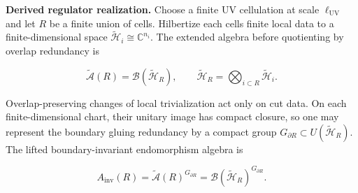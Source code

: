 \textbf{Derived regulator realization.} Choose a finite UV cellulation at scale \(\ell_{\mathrm{UV}}\) and let \(R\) be a finite union of cells. Hilbertize each cell\textquotesingle s finite local data to a finite-dimensional space \(\tilde{\mathcal H}_i\cong \mathbb C^{n_i}\). The extended algebra before quotienting by overlap redundancy is

\[
\widetilde{\mathcal A}(R)=\mathcal B(\tilde{\mathcal H}_R),
\qquad
\tilde{\mathcal H}_R=\bigotimes_{i\subset R}\tilde{\mathcal H}_i.
\]

Overlap-preserving changes of local trivialization act only on cut data. On each finite-dimensional chart, their unitary image has compact closure, so one may represent the boundary gluing redundancy by a compact group \(G_{\partial R}\subset U(\tilde{\mathcal H}_R)\). The lifted boundary-invariant endomorphism algebra is

\[
A_{\mathrm{inv}}(R)=\widetilde{\mathcal A}(R)^{G_{\partial R}}
=\mathcal B(\tilde{\mathcal H}_R)^{G_{\partial R}}.
\]

